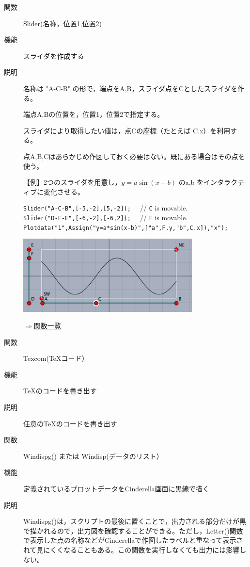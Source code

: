 \documentclass[papersize,a4paper,12pt,uplatex]{jsarticle}
\begin{document}
\begin{description}
\vspace{\baselineskip}
\hypertarget{slider}{}
\item[関数]  Slider(名称，位置1,位置2)
\item[機能]  スライダを作成する
\item[説明]  名称は "A-C-B" の形で，端点をA,B，スライダ点をCとしたスライダを作る。

端点A,Bの位置を，位置1，位置2で指定する。

スライダにより取得したい値は，点Cの座標（たとえば C.x）を利用する。

点A,B,Cはあらかじめ作図しておく必要はない。既にある場合はその点を使う。

\vspace{\baselineskip}
【例】2つのスライダを用意し，$y=a\sin(x-b)$ のa,b をインタラクティブに変化させる。
  
\verb|Slider("A-C-B",[-5,-2],[5,-2]);  | // \verb|C| is movable.\\
\verb|Slider("D-F-E",[-6,-2],[-6,2]);  | // \verb|F| is movable.\\
\verb|Plotdata("1",Assign("y=a*sin(x-b)",["a",F.y,"b",C.x]),"x"); |

\vspace{\baselineskip}
\hspace{15mm}
\includegraphics[bb=0.00 0.00 445.02 193.01,height=40mm]{Fig/slider.pdf} 

\begin{flushright}  \hyperlink{functionlist}{$\Rightarrow$関数一覧}\end{flushright}

\vspace{\baselineskip}
\hypertarget{texcom}{}
\item[関数]  Texcom(\TeX コード）
\item[機能]  \TeX のコードを書き出す
\item[説明]  任意の\TeX のコードを書き出す

\vspace{\baselineskip}
\hypertarget{windispg}{}
\item[関数]  Windispg()  または  Windisp(データのリスト）
\item[機能]  定義されているプロットデータをCinderella画面に黒線で描く
\item[説明]  Windispg()は，スクリプトの最後に置くことで，出力される部分だけが黒で描かれるので，出力図を確認することができる。ただし，Letter()関数で表示した点の名称などがCinderellaで作図したラベルと重なって表示されて見にくくなることもある。この関数を実行しなくても出力には影響しない。


\end{description}
\end{document}
